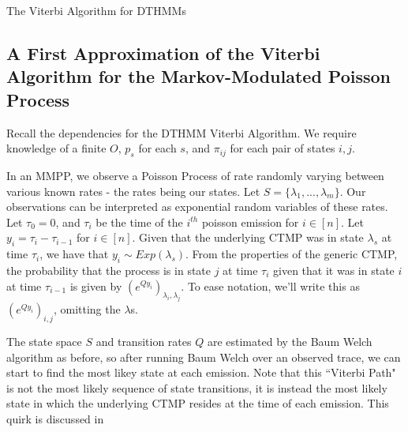 \begin{algorithm}
\SetAlgoLined
{}

\caption{The Viterbi Algorithm for DTHMMs}\label{algvitdthmm}

\end{algorithm}

\subsection{A First Approximation of the Viterbi Algorithm for the Markov-Modulated Poisson Process}

Recall the dependencies for the DTHMM Viterbi Algorithm. We require knowledge of a finite $O$, $p_s$ for each $s$, and $\pi_{ij}$ for each pair of states $i,j$.

In an MMPP, we observe a Poisson Process of rate randomly varying between various known rates - the rates being our states. Let $S = \{\lambda_1,...,\lambda_m\}$. Our observations can be interpreted as exponential random variables of these rates. Let $\tau_0 = 0$, and $\tau_i$ be the time of the $i^{th}$ poisson emission for $i \in [n]$. Let $y_i = \tau_i-\tau_{i-1}$ for $i \in [n]$. Given that the underlying CTMP was in state $\lambda_s$ at time $\tau_i$, we have that $y_i \sim Exp (\lambda_s)$. From the properties of the generic CTMP, the probability that the process is in state $j$ at time $\tau_i$ given that it was in state $i$ at time $\tau_{i-1}$ is given by $(e^{Qy_i})_{\lambda_{i},\lambda_{j}}$. To ease notation, we'll write this as $(e^{Qy_i})_{i,j}$, omitting the $\lambda$s.

The state space $S$ and transition rates $Q$ are estimated by the Baum Welch algorithm as before, so after running Baum Welch over an observed trace, we can start to find the most likey state at each emission. Note that this ``Viterbi Path" is not the most likely sequence of state transitions, it is instead the most likely state in which the underlying CTMP resides at the time of each emission. This quirk is discussed in %

